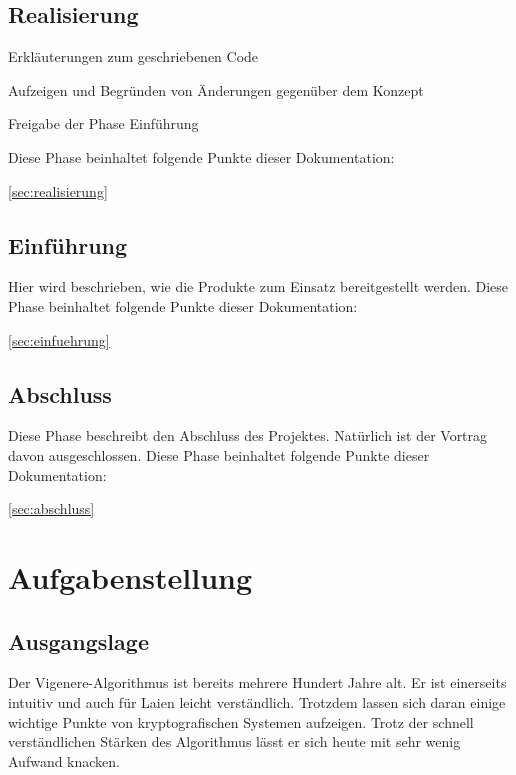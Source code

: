 \documentclass[11pt,paper=a4,final]{scrartcl}
\begin{document}
\subsection{Realisierung}
\begin{itemize*}
  \item Erkläuterungen zum geschriebenen Code
  \item Aufzeigen und Begründen von Änderungen gegenüber dem Konzept
  \item Freigabe der Phase Einführung
\end{itemize*}
Diese Phase beinhaltet folgende Punkte dieser Dokumentation:
\begin{itemize*}
  \item \ref{sec:realisierung} 
\end{itemize*}
\subsection{Einf\"uhrung}
Hier wird beschrieben, wie die Produkte zum Einsatz bereitgestellt werden.
Diese Phase beinhaltet folgende Punkte dieser Dokumentation:
\begin{itemize*}
  \item \ref{sec:einfuehrung} 
\end{itemize*}
\subsection{Abschluss}
Diese Phase beschreibt den Abschluss des Projektes. Nat\"urlich ist der Vortrag
davon ausgeschlossen. Diese Phase beinhaltet folgende Punkte dieser
Dokumentation:
\begin{itemize*}
  \item \ref{sec:abschluss} 
\end{itemize*}
\section{Aufgabenstellung}
\subsection{Ausgangslage}
Der Vigenere-Algorithmus ist bereits mehrere Hundert Jahre alt. Er ist
einerseits intuitiv und auch f\"ur Laien leicht verst\"andlich. Trotzdem lassen
sich daran einige wichtige Punkte von kryptografischen Systemen aufzeigen. Trotz
der schnell verst\"andlichen St\"arken des Algorithmus l\"asst er sich heute mit
sehr wenig Aufwand knacken. 
\end{document}
